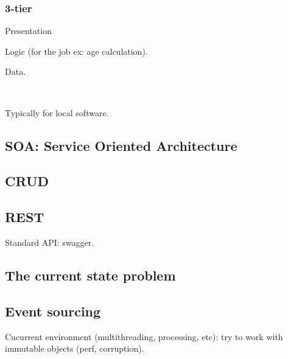 \documentclass[a4paper,11pt]{article}
\begin{document}
\subsubsection{3-tier}

Presentation

Logic (for the job ex: age calculation).

Data.

\

Typically for local software.

\subsection{SOA: Service Oriented Architecture}

\subsection{CRUD}

\subsection{REST}

Standard API: swagger.

\subsection{The current state problem}

\subsection{Event sourcing}

Cucurrent environment (multithreading, processing, etc): try to work with
immutable objects (perf, corruption).
\end{document}
